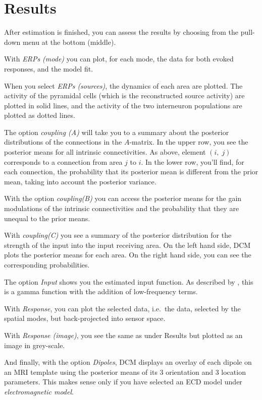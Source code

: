 \section{Results}
After estimation is finished, you can assess the results
by choosing from the pull-down menu at the bottom (middle).

With \textit{ERPs (mode)} you can plot, for each mode, the data for
both evoked responses, and the model fit.

When you select \textit{ERPs (sources)}, the dynamics of each area are
plotted. The activity of the pyramidal cells (which is the
reconstructed source activity) are plotted in solid
lines, and the activity of the two interneuron populations are plotted
as dotted lines.

The option \textit{coupling (A)} will take you to a summary about the
posterior distributions of the connections in the $A$-matrix. In the
upper row, you see the posterior means for all intrinsic
connectivities. As above, element $(i,\; j)$ corresponds to a
connection from area $j$ to $i$. In the lower row, you'll find, for
each connection, the probability that its posterior mean is different
from the prior mean, taking into account the posterior variance.

With the option \textit{coupling(B)} you can access the posterior
means for the gain modulations of the intrinsic connectivities and
the probability that they are unequal to the prior means.

With \textit{coupling(C)} you see a summary of the posterior
distribution for the strength of the input into the input receiving
area. On the left hand side, DCM plots the posterior means for each
area. On the right hand side, you can see the corresponding
probabilities.


The option \textit{Input} shows you the estimated input function. As
described by \cite{od_dcm_erp}, this is a gamma function with the
addition of low-frequency terms.

With \textit{Response}, you can plot the selected data, i.e.~the data,
selected by the spatial modes, but back-projected into sensor space.

With \textit{Response (image)}, you see the same as under Results but
plotted as an image in grey-scale.

And finally, with the option \textit{Dipoles}, DCM displays an
overlay of each dipole on an MRI template using the posterior means of
its 3 orientation and 3 location parameters. This makes sense only if
you have selected an ECD model under \textit{electromagnetic model}.

